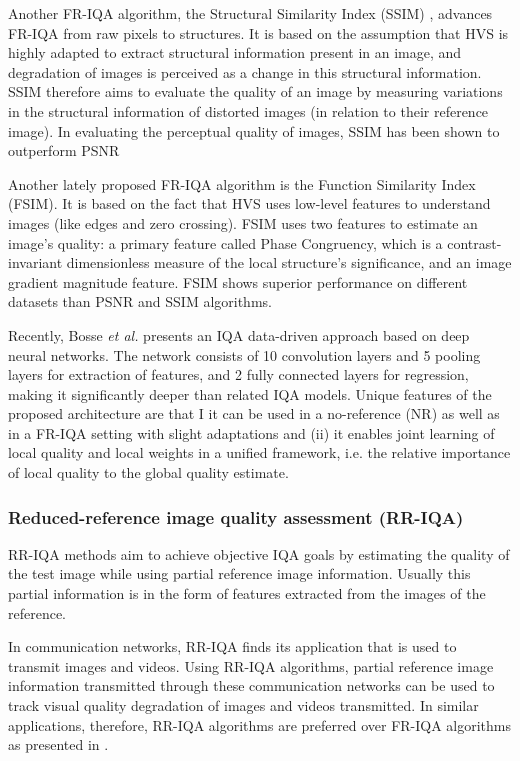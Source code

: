 Another FR-IQA algorithm, the Structural Similarity Index (SSIM) \cite{Wang2004}, advances FR-IQA from raw pixels to structures. It is based on the assumption that HVS is highly adapted to extract structural information present in an image, and degradation of images is perceived as a change in this structural information. SSIM therefore aims to evaluate the quality of an image by measuring variations in the structural information of distorted images (in relation to their reference image). In evaluating the perceptual quality of images, SSIM has been shown to outperform PSNR 

Another lately proposed FR-IQA \cite{Zhang2011} algorithm is the Function Similarity Index (FSIM). It is based on the fact that HVS uses low-level features to understand images (like edges and zero crossing). FSIM uses two features to estimate an image's quality: a primary feature called Phase Congruency, which is a contrast-invariant dimensionless measure of the local structure's significance, and an image gradient magnitude feature. FSIM shows superior performance on different datasets than PSNR and SSIM algorithms. 

Recently, Bosse \emph{et al.} \cite{Bosse2018} presents an IQA data-driven approach based on deep neural networks. The network consists of 10 convolution layers and 5 pooling layers for extraction of features, and 2 fully connected layers for regression, making it significantly deeper than related IQA models. Unique features of the proposed architecture are that I it can be used in a no-reference (NR) as well as in a FR-IQA setting with slight adaptations and (ii) it enables joint learning of local quality and local weights in a unified framework, i.e. the relative importance of local quality to the global quality estimate. 

\subsubsection{Reduced-reference image quality assessment (RR-IQA)}

RR-IQA methods aim to achieve objective IQA goals by estimating the quality of the test image while using partial reference image information. Usually this partial information is in the form of features extracted from the images of the reference. 

In communication networks, RR-IQA finds its application that is used to transmit images and videos. Using RR-IQA algorithms, partial reference image information transmitted through these communication networks can be used to track visual quality degradation of images and videos transmitted. In similar applications, therefore, RR-IQA algorithms are preferred over FR-IQA algorithms as presented in \cite{Atsawaraungsuk2015, Redi2010}.

